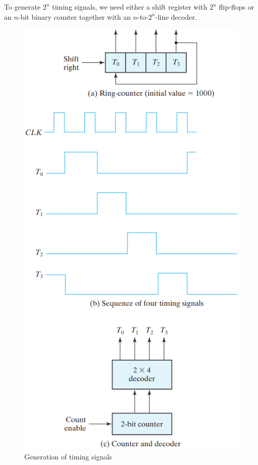 To generate $2^n$ timing signals, we need either a shift register with $2^n$ flip-flops or an $n$-bit binary counter together with an $n$-to-$2^n$-line decoder.

\setcounter{figure}{16}

\begin{figure}[H]
  \centering
  \includegraphics[width=\linewidth]{img/fig-6.17.png}
  \caption{Generation of timing signals}
  \label{fig:6.17}
\end{figure}

